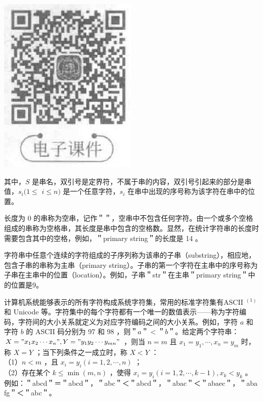 \documentclass[10pt]{article}
\begin{document}
\begin{center}
\includegraphics[max width=\textwidth]{2025_06_06_704745ea57b15b2333e5g-114}
\end{center}

其中，$S$ 是串名，双引号是定界符，不属于串的内容，双引号引起来的部分是串值，$s_{i}(1 \leqslant$ $i \leqslant n)$ 是一个任意字符，$s_{i}$ 在串中出现的序号称为该字符在串中的位置。

长度为 0 的串称为空串，记作＂＂，空串中不包含任何字符。由一个或多个空格组成的串称为空格串，其长度是串中包含的空格数。显然，在统计字符串的长度时需要包含其中的空格，例如，＂primary string＂的长度是 14 。

字符串中任意个连续的字符组成的子序列称为该串的子串（substring），相应地，包含子串的串称为主串（primary string）。子串的第一个字符在主串中的序号称为子串在主串中的位置（location）。例如，子串＂str＂在主串＂primary string＂中的位置是9。

计算机系统能够表示的所有字符构成系统字符集，常用的标准字符集有ASCII ${ }^{(1)}$ 和 Unicode 等。字符集中的每个字符都有一个唯一的数值表示——称为字符编码，字符间的大小关系就定义为对应字符编码之间的大小关系。例如，字符 $a$ 和字符 $b$ 的 ASCII 码分别为 97 和 98 ，则＂$a$＂$<$＂$b$＂。给定两个字符串：$X=" x_{1} x_{2} \cdots x_{n} ", Y=" y_{1} y_{2} \cdots y_{m n} "$ ，则当 $n=m$ 且 $x_{1}=y_{1}, \cdots, x_{n}=y_{m}$ 时，称 $X=Y$ ；当下列条件之一成立时，称 $X<Y$ ：\\
（1）$n<m$ ，且 $x_{i}=y_{i}(i=1,2, \cdots, n)$ ；\\
（2）存在某个 $k \leqslant \min (m, n)$ ，使得 $x_{i}=y_{i}(i=1,2, \cdots, k-1), x_{k}<y_{k}$ 。\\
例如：＂abcd＂＝＂abcd＂，＂abc＂＜＂abcd＂，＂abac＂＜＂abaec＂，＂aba fg＂＜＂abc＂。
\end{document}
